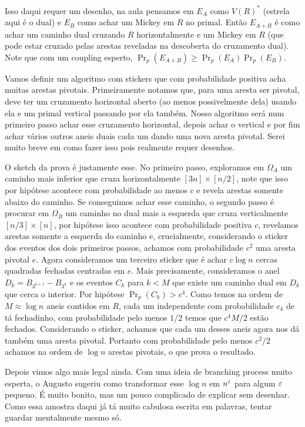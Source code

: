 Isso daqui requer um desenho, na aula pensamos em $E_A$ como $V(R)^*$
(estrela aqui é o dual)
e $E_B$ como achar um Mickey em $R$ no primal. Então $E_{A + B}$ é como achar um
caminho dual cruzando $R$ horizontalmente e um Mickey em $R$ (que
	pode estar cruzado pelas
arestas reveladas na descoberta do cruzamento dual). Note que com um
coupling esperto,
$\Pr_p(E_{A + B}) \geq \Pr_p(E_A)\Pr_p(E_B)$.

Vamos definir um algoritmo com stickers que com probabilidade
positiva acha muitas arestas pivotais.
Primeiramente notamos que, para uma aresta ser pivotal, deve ter um
cruzamento horizontal aberto (ao menos
possivelmente dela) usando ela e um primal vertical passando por ela
também. Nosso algoritmo
será num primeiro passo achar esse cruzamento horizontal, depois
achar o vertical e por fim
achar vários outros aneis duais cada um dando uma nova aresta pivotal.
Serei muito breve
em como fazer isso pois realmente requer desenhos.

O sketch da prova é justamente esse. No primeiro passo, exploramos em
$\Omega_A$ um caminho
mais inferior que cruza horizontalmente $[3n]\times[n/2]$, note que
isso por hipótese
acontece com probabilidade ao menos $c$ e revela arestas somente abaixo
do caminho. Se conseguimos achar esse caminho, o segundo passo é procurar
em $\Omega_B$ um caminho no dual mais a esquerda que cruza
verticalmente $[n/3]\times[n]$,
por hipótese isso acontece com probabilidade positiva $c$, revelamos
arestas somente
a esquerda do caminho e, crucialmente, considerando o sticker dos
eventos dos dois primeiros passos,
achamos com probabilidade $c^2$ uma aresta pivotal $e$. Agora consideramos
um terceiro sticker que é achar $c\log n$ cercas quadradas fechadas
centradas em $e$.
Mais precisamente, consideramos o anel $D_k = B_{3^{k+1}} - B_{3^k}$
e os eventos $C_k$ para $k < M$
que existe um caminho dual em $D_k$ que cerca o interior. Por
hipótese $\Pr_p(C_k) > c^4$.
Como temos na ordem de $M \approx \log n$ aneis contidos em $R$,
cada um independente com probabilidade $c_4$ de tá fechadinho,
com probabilidade pelo menos $1/2$ temos que $c^4M/2 $ estão fechados.
Considerando
o sticker, achamos que cada um desses aneis agora nos dá também uma
aresta pivotal. Portanto com probabilidade pelo menos $c^2/2$ achamos
na ordem de $\log n$
arestas pivotais, o que prova o resultado.

Depois vimos algo mais legal ainda. Com uma ideia de branching
process muito esperta,
o Augusto sugeriu como transformar esse $\log n$ em $n^{\varepsilon}$
para algum $\varepsilon$ pequeno. É muito bonito, mas um pouco complicado de
explicar sem
desenhar. Como essa amostra daqui já tá muito cabulosa escrita em
palavras, tentar guardar
mentalmente mesmo só.

